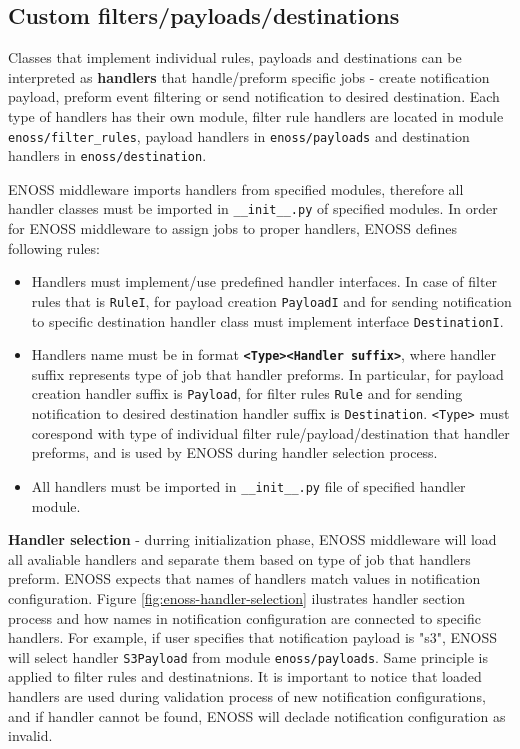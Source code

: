     \subsection{Custom filters/payloads/destinations}

    Classes that implement individual rules, payloads and destinations can be interpreted as \textbf{handlers} that handle/preform specific jobs - create notification payload, preform event filtering or send notification to desired destination. Each type of handlers has their own module, filter rule handlers are located in module \texttt{enoss/filter\_rules}, payload handlers in \texttt{enoss/payloads} and destination handlers in \texttt{enoss/destination}.

    ENOSS middleware imports handlers from specified modules, therefore all handler classes must be imported in \texttt{\_\_init\_\_.py} of specified modules. In order for ENOSS middleware to assign jobs to proper handlers, ENOSS defines following rules:
    \begin{itemize}
        \item Handlers must implement/use predefined handler interfaces. In case of filter rules that is \texttt{RuleI}, for payload creation \texttt{PayloadI} and for sending notification to specific destination handler class must implement interface \texttt{DestinationI}.
        \item Handlers name must be in format \textbf{\texttt{<Type><Handler suffix>}}, where handler suffix represents type of job that handler preforms. In particular, for payload creation handler suffix is \texttt{Payload}, for filter rules \texttt{Rule} and for sending notification to desired destination handler suffix is \texttt{Destination}. \texttt{<Type>} must corespond with type of individual filter rule/payload/destination that handler preforms, and is used by ENOSS during handler selection process.
        \item All handlers must be imported in \texttt{\_\_init\_\_.py} file of specified handler module.
    \end{itemize}

    \textbf{Handler selection} - durring initialization phase, ENOSS middleware will load all avaliable handlers and separate them based on type of job that handlers preform. ENOSS expects that names of handlers match values in notification configuration. Figure \ref{fig:enoss-handler-selection} ilustrates handler section process and how names in notification configuration are connected to specific handlers. For example, if user specifies that notification payload is "s3", ENOSS will select handler \texttt{S3Payload} from module \texttt{enoss/payloads}. Same principle is applied to filter rules and destinatnions. It is important to notice that loaded handlers are used during validation process of new notification configurations, and if handler cannot be found, ENOSS will declade notification configuration as invalid.

